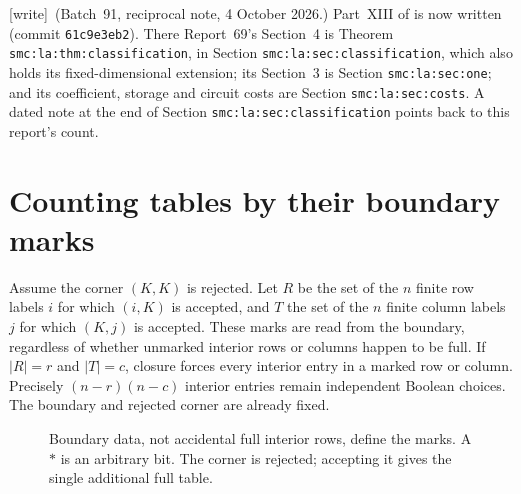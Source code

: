\documentclass[11pt]{article}
\theoremstyle{definition}
\theoremstyle{remark}
\newcommand{\wtag}{\textup{[write]}}
\begin{document}
\wtag\ (Batch~91, reciprocal note, 4 October 2026.) Part~XIII of
\cite{smc} is now written (commit \texttt{61c9e3eb2}). There Report~69's
Section~4 is Theorem \texttt{smc:la:thm:classification}, in Section
\texttt{smc:la:sec:classification}, which also holds its
fixed-dimensional extension; its Section~3 is Section
\texttt{smc:la:sec:one}; and its coefficient, storage and circuit costs are
Section \texttt{smc:la:sec:costs}. A dated note at the end of Section
\texttt{smc:la:sec:classification} points back to this report's count.

\section{Counting tables by their boundary marks}\label{cta:sec:count}

Assume the corner $(K,K)$ is rejected. Let $R$ be the set of the $n$ finite
row labels $i$ for which $(i,K)$ is accepted, and $T$ the set of the $n$
finite column labels $j$ for which $(K,j)$ is accepted. These marks are
read from the boundary, regardless of whether unmarked interior rows or
columns happen to be full. If $|R|=r$ and $|T|=c$, closure forces every
interior entry in a marked row or column. Precisely $(n-r)(n-c)$ interior
entries remain independent Boolean choices. The boundary and rejected
corner are already fixed.

\begin{figure}[htbp]
\centering
{}
\caption{Boundary data, not accidental full interior rows, define the marks.
A $*$ is an arbitrary bit. The corner is rejected; accepting it gives the
single additional full table.}
\label{cta:fig:boundary}
\end{figure}
\end{document}
